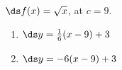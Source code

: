 {$\ds f(x) = \sqrt{x}$, at $c=9$.
}
{\begin{enumerate}
\item		$\ds y = \frac{1}{6}(x-9) +3$
\item		$\ds y = -6(x-9) +3$
\end{enumerate}
}
